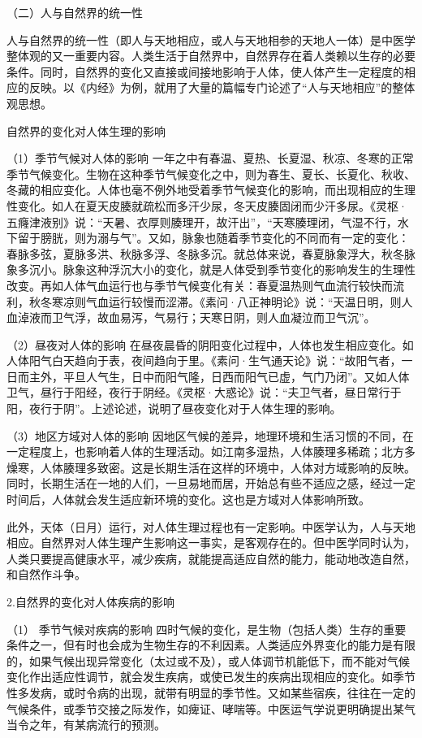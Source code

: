 \documentclass[a4paper,12pt,UTF8,twoside]{ctexbook}
\begin{document}
（二）人与自然界的统一性

人与自然界的统一性（即人与天地相应，或人与天地相参的天地人一体）是中医学整体观的又一重要内容。人类生活于自然界中，自然界存在着人类赖以生存的必要条件。同时，自然界的变化又直接或间接地影响于人体，使人体产生一定程度的相应的反映。以《内经》为例，就用了大量的篇幅专门论述了“人与天地相应”的整体观思想。

自然界的变化对人体生理的影响

（1）季节气候对人体的影响 一年之中有春温、夏热、长夏湿、秋凉、冬寒的正常季节气候变化。生物在这种季节气候变化之中，则为春生、夏长、长夏化、秋收、冬藏的相应变化。人体也毫不例外地受着季节气候变化的影响，而出现相应的生理性变化。如人在夏天皮腠就疏松而多汗少尿，冬天皮腠固闭而少汗多尿。《灵枢·五癃津液别》说：“天暑、衣厚则腠理开，故汗出”，“天寒腠理闭，气湿不行，水下留于膀胱，则为溺与气”。又如，脉象也随着季节变化的不同而有一定的变化：春脉多弦，夏脉多洪、秋脉多浮、冬脉多沉。就总体来说，春夏脉象浮大，秋冬脉象多沉小。脉象这种浮沉大小的变化，就是人体受到季节变化的影响发生的生理性改变。再如人体气血运行也与季节气候变化有关：春夏温热则气血流行较快而流利，秋冬寒凉则气血运行较慢而涩滞。《素问·八正神明论》说：“天温日明，则人血淖液而卫气浮，故血易泻，气易行；天寒日阴，则人血凝泣而卫气沉”。

（2）昼夜对人体的影响 在昼夜晨昏的阴阳变化过程中，人体也发生相应变化。如人体阳气白天趋向于表，夜间趋向于里。《素问·生气通天论》说：“故阳气者，一日而主外，平旦人气生，日中而阳气隆，日西而阳气已虚，气门乃闭”。又如人体卫气，昼行于阳经，夜行于阴经。《灵枢·大惑论》说：“夫卫气者，昼日常行于阳，夜行于阴”。上述论述，说明了昼夜变化对于人体生理的影响。

（3）地区方域对人体的影响 因地区气候的差异，地理环境和生活习惯的不同，在一定程度上，也影响着人体的生理活动。如江南多湿热，人体腠理多稀疏；北方多燥寒，人体腠理多致密。这是长期生活在这样的环境中，人体对方域影响的反映。同时，长期生活在一地的人们，一旦易地而居，开始总有些不适应之感，经过一定时间后，人体就会发生适应新环境的变化。这也是方域对人体影响所致。

此外，天体（日月）运行，对人体生理过程也有一定影响。中医学认为，人与天地相应。自然界对人体生理产生影响这一事实，是客观存在的。但中医学同时认为，人类只要提高健康水平，减少疾病，就能提高适应自然的能力，能动地改造自然，和自然作斗争。

2.自然界的变化对人体疾病的影响

（1） 季节气候对疾病的影响 四时气候的变化，是生物（包括人类）生存的重要条件之一，但有时也会成为生物生存的不利因素。人类适应外界变化的能力是有限的，如果气候出现异常变化（太过或不及），或人体调节机能低下，而不能对气候变化作出适应性调节，就会发生疾病，或使已发生的疾病出现相应的变化。如季节性多发病，或时令病的出现，就带有明显的季节性。又如某些宿疾，往往在一定的气候条件，或季节交接之际发作，如痺证、哮喘等。中医运气学说更明确提出某气当令之年，有某病流行的预测。
\end{document}
